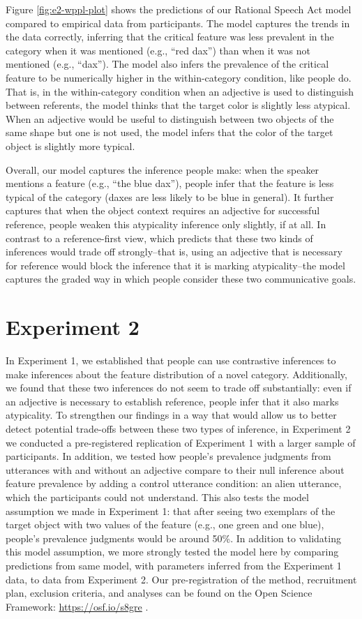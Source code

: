 \documentclass{ucetd}
\begin{document}
Figure \ref{fig:e2-wppl-plot} shows the predictions of our Rational
Speech Act model compared to empirical data from participants. The model
captures the trends in the data correctly, inferring that the critical
feature was less prevalent in the category when it was mentioned (e.g.,
``red dax'') than when it was not mentioned (e.g., ``dax''). The model
also infers the prevalence of the critical feature to be numerically
higher in the within-category condition, like people do. That is, in the
within-category condition when an adjective is used to distinguish
between referents, the model thinks that the target color is slightly
less atypical. When an adjective would be useful to distinguish between
two objects of the same shape but one is not used, the model infers that
the color of the target object is slightly more typical.

Overall, our model captures the inference people make: when the speaker
mentions a feature (e.g., ``the blue dax''), people infer that the
feature is less typical of the category (daxes are less likely to be
blue in general). It further captures that when the object context
requires an adjective for successful reference, people weaken this
atypicality inference only slightly, if at all. In contrast to a
reference-first view, which predicts that these two kinds of inferences
would trade off strongly--that is, using an adjective that is necessary
for reference would block the inference that it is marking
atypicality--the model captures the graded way in which people consider
these two communicative goals.

\hypertarget{experiment-2}{%
\section{Experiment 2}\label{experiment-2}}

In Experiment 1, we established that people can use contrastive
inferences to make inferences about the feature distribution of a novel
category. Additionally, we found that these two inferences do not seem
to trade off substantially: even if an adjective is necessary to
establish reference, people infer that it also marks atypicality. To
strengthen our findings in a way that would allow us to better detect
potential trade-offs between these two types of inference, in Experiment
2 we conducted a pre-registered replication of Experiment 1 with a
larger sample of participants. In addition, we tested how people's
prevalence judgments from utterances with and without an adjective
compare to their null inference about feature prevalence by adding a
control utterance condition: an alien utterance, which the participants
could not understand. This also tests the model assumption we made in
Experiment 1: that after seeing two exemplars of the target object with
two values of the feature (e.g., one green and one blue), people's
prevalence judgments would be around 50\%. In addition to validating
this model assumption, we more strongly tested the model here by
comparing predictions from same model, with parameters inferred from the
Experiment 1 data, to data from Experiment 2. Our pre-registration of
the method, recruitment plan, exclusion criteria, and analyses can be
found on the Open Science Framework: \url{https://osf.io/s8gre} .
\end{document}
